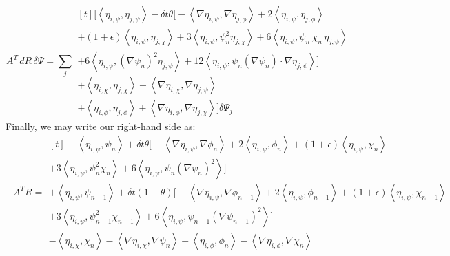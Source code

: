 \documentclass[reqno]{article}
\begin{document}
\begin{equation}
    A^T \, dR \, \delta \Psi
    =
    \sum_{j}
    \begin{multlined}[t]
    \Biggl[
        \left<\eta_{i, \psi}, \eta_{j, \psi} \right>
        - \delta t \theta \bigl[ -\left< \nabla \eta_{i, \psi}, \nabla \eta_{j, \phi} \right>
            + 2 \left< \eta_{i, \psi}, \eta_{j, \phi} \right> \\
            + \left(1 + \epsilon\right) \left< \eta_{i, \psi}, \eta_{j, \chi} \right>
            + 3 \left< \eta_{i, \psi}, \psi_n^2 \eta_{j, \chi} \right> 
            + 6 \left< \eta_{i, \psi}, \psi_n \, \chi_n \, \eta_{j, \psi} \right> \\
            + 6 \left<\eta_{i, \psi}, \left(\nabla \psi_n\right)^2 \eta_{j, \psi} \right>
            + 12 \left< \eta_{i, \psi}, \psi_n \left(\nabla \psi_n \right) \cdot \nabla \eta_{j, \psi} \right>
        \bigr] \\
        + \left< \eta_{i, \chi}, \eta_{j, \chi} \right>
        + \left< \nabla \eta_{i, \chi}, \nabla \eta_{j, \psi} \right> \\
        + \left< \eta_{i, \phi}, \eta_{j, \phi} \right>
        + \left< \nabla \eta_{i, \phi}, \nabla \eta_{j, \chi} \right>
    \Biggr]
    \delta \Psi_j
    \end{multlined}
\end{equation}
Finally, we may write our right-hand side as:
\begin{equation}
    -A^T R
    =
    \begin{multlined}[t]
        -\left<\eta_{i, \psi}, \psi_n \right>
        + \delta t \theta \bigl[
            -\left<\nabla\eta_{i, \psi}, \nabla \phi_n \right> 
            + 2 \left< \eta_{i, \psi}, \phi_n \right>  
            + \left(1 + \epsilon\right) \left< \eta_{i, \psi}, \chi_n \right> \\
            + 3 \left< \eta_{i, \psi}, \psi_n^2 \chi_n \right>
            + 6 \left< \eta_{i, \psi}, \psi_n \left(\nabla \psi_n \right)^2 \right>
            \bigr] \\
        + \left< \eta_{i, \psi}, \psi_{n - 1} \right>
        + \delta t \left(1 - \theta \right) \bigl[
            -\left<\nabla \eta_{i, \psi}, \nabla \phi_{n - 1} \right>
            + 2 \left< \eta_{i, \psi}, \phi_{n - 1} \right> 
            + \left(1 + \epsilon\right) \left<\eta_{i, \psi}, \chi_{n - 1} \right> \\
            + 3 \left< \eta_{i, \psi}, \psi_{n - 1}^2 \chi_{n - 1} \right> 
            + 6 \left< \eta_{i, \psi}, \psi_{n - 1} \left(\nabla \psi_{n - 1}\right)^2 \right>
        \bigr] \\
        - \left<\eta_{i, \chi}, \chi_n \right>
        - \left<\nabla\eta_{i, \chi}, \nabla \psi_n\right>
        - \left< \eta_{i, \phi}, \phi_n \right>
        - \left< \nabla\eta_{i, \phi}, \nabla \chi_n \right>
    \end{multlined}
\end{equation}
\end{document}
